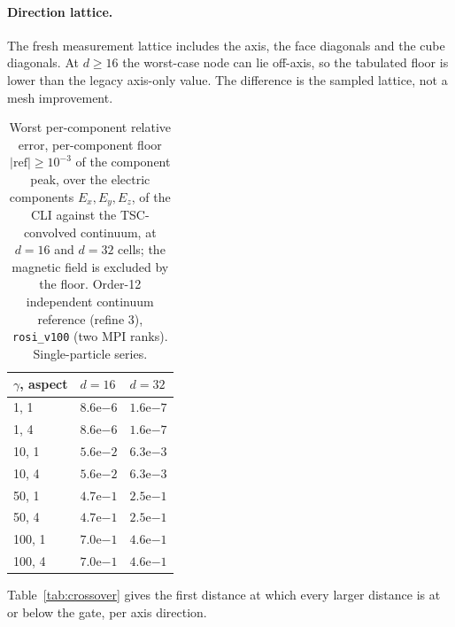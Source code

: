 \paragraph{Direction lattice.}
The fresh measurement lattice includes the axis, the face diagonals and the
cube diagonals. At $d\ge16$ the worst-case node can lie off-axis, so the
tabulated floor is lower than the legacy axis-only value. The difference is
the sampled lattice, not a mesh improvement.

\begin{table}[t]
\centering
\small
\caption{Worst per-component relative error, per-component floor
$|\mathrm{ref}|\ge10^{-3}$ of the component peak, over the electric
components $E_x,E_y,E_z$, of the CLI against the TSC-convolved continuum,
at $d=16$ and $d=32$ cells; the magnetic field is excluded by the floor.
Order-12 independent continuum reference (refine 3),
\texttt{rosi\_v100} (two MPI ranks). Single-particle series.}
\label{tab:w4b}
\begin{tabular}{lll}
\toprule
$\gamma$, aspect & $d\!=\!16$ & $d\!=\!32$ \\
\midrule
1, 1   & $8.6\mathrm{e}{-6}$ & $1.6\mathrm{e}{-7}$ \\
1, 4   & $8.6\mathrm{e}{-6}$ & $1.6\mathrm{e}{-7}$ \\
10, 1  & $5.6\mathrm{e}{-2}$ & $6.3\mathrm{e}{-3}$ \\
10, 4  & $5.6\mathrm{e}{-2}$ & $6.3\mathrm{e}{-3}$ \\
50, 1  & $4.7\mathrm{e}{-1}$ & $2.5\mathrm{e}{-1}$ \\
50, 4  & $4.7\mathrm{e}{-1}$ & $2.5\mathrm{e}{-1}$ \\
100, 1 & $7.0\mathrm{e}{-1}$ & $4.6\mathrm{e}{-1}$ \\
100, 4 & $7.0\mathrm{e}{-1}$ & $4.6\mathrm{e}{-1}$ \\
\bottomrule
\end{tabular}
\end{table}

Table~\ref{tab:crossover} gives the first distance at which every larger
distance is at or below the gate, per axis direction.


